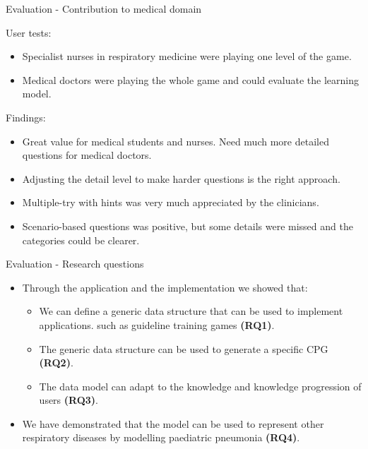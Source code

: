 \documentclass{beamer}
\begin{document}
\begin{frame}{Evaluation - Contribution to medical domain}
\begin{block}{User tests:}
	\begin{itemize}
		\item Specialist nurses in respiratory medicine were playing one level of the game.
		\item Medical doctors were playing the whole game and could evaluate the learning model.
	\end{itemize}
\end{block}
\begin{block}{Findings:}
	\begin{itemize}
		\item Great value for medical students and nurses. Need much more detailed questions for medical doctors.
		\item Adjusting the detail level to make harder questions is the right approach.
		\item Multiple-try with hints was very much appreciated by the clinicians.
		\item Scenario-based questions was positive, but some details were missed and the categories could be clearer.
	\end{itemize}
\end{block}
\end{frame}



\begin{frame}{Evaluation - Research questions}
\begin{itemize}
	\item Through the application and the implementation we showed that:
	\begin{itemize}
		\item We can define a generic data structure that can be used to implement applications. such as guideline training games \textbf{(RQ1)}.
		\item The generic data structure can be used to generate a specific CPG \textbf{(RQ2)}.
		\item The data model can adapt to the knowledge and knowledge progression of users \textbf{(RQ3)}.
	\end{itemize}
	\item We have demonstrated that the model can be used to represent other respiratory diseases by modelling paediatric pneumonia \textbf{(RQ4)}.
\end{itemize}
\end{frame}
\end{document}
